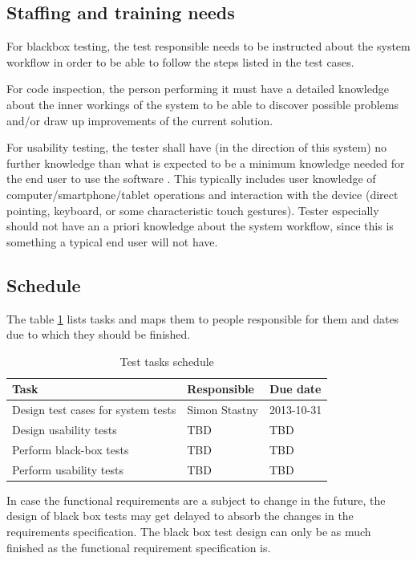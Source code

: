 \documentclass[11pt]{book}
\begin{document}
\subsection{Staffing and training needs}
For blackbox testing, the test responsible needs to be instructed about the system workflow in order to be able to follow the steps listed in the test cases.

For code inspection, the person performing it must have a detailed knowledge about the inner workings of the system to be able to discover possible problems and/or draw up improvements of the current solution.

For usability testing, the tester shall have (in the direction of this system) no further knowledge than what is expected to be a minimum knowledge needed for the end user to use the software . This typically includes user knowledge of computer/smartphone/tablet operations and interaction with the device (direct pointing, keyboard, or some characteristic touch gestures). Tester especially should not have an a priori knowledge about the system workflow, since this is something a typical end user will not have.
\subsection{Schedule}

The table \ref{tab:test_plan_schedule} lists tasks and maps them to people responsible for them and dates due to which they should be finished. 

\begin{table}[H]
	\centering
	\begin{tabular}{| l | l | l |}
		\hline
		Task 								& Responsible 	& Due date		\\ \hline
		Design test cases for system tests 	& Simon Stastny & 2013-10-31 	\\ \hline
		Design usability tests 				& TBD 			& TBD 			\\ \hline
		Perform black-box tests 			& TBD 			& TBD 			\\ \hline
		Perform usability tests 			& TBD 			& TBD 			\\ \hline
	\end{tabular}
	\label{tab:test_plan_schedule}
	\caption{Test tasks schedule}
\end{table}

In case the functional requirements are a subject to change in the future, the design of black box tests may get delayed to absorb the changes in the requirements specification. The black box test design can only be as much finished as the functional requirement specification is.
\end{document}
